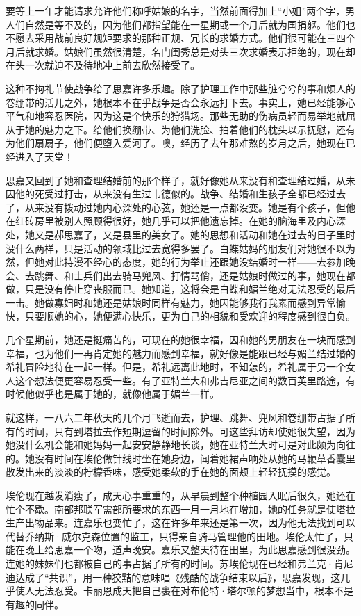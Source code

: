 \par 要等上一年才能请求允许他们称呼姑娘的名字，当然前面得加上“小姐”两个字，男人们自然是等不及的，因为他们都指望能在一星期或一个月后就为国捐躯。他们也不愿去采用战前良好规矩要求的那种正规、冗长的求婚方式。他们很可能在三四个月后就求婚。姑娘们虽然很清楚，名门闺秀总是对头三次求婚表示拒绝的，现在却在头一次就迫不及待地冲上前去欣然接受了。
\par 这种不拘礼节使战争给了思嘉许多乐趣。除了护理工作中那些脏兮兮的事和烦人的卷绷带的活儿之外，她根本不在乎战争是否会永远打下去。事实上，她已经能够心平气和地容忍医院，因为这是个快乐的狩猎场。那些无助的伤病员轻而易举地就屈从于她的魅力之下。给他们换绷带、为他们洗脸、拍着他们的枕头以示抚慰，还有为他们扇扇子，他们便堕入爱河了。噢，经历了去年那难熬的岁月之后，她现在已经进入了天堂！
\par 思嘉又回到了她和查理结婚前的那个样子，就好像她从来没有和查理结过婚，从未因他的死受过打击，从来没有生过韦德似的。战争、结婚和生孩子全都已经过去了，从来没有拨动过她内心深处的心弦，她还是一点都没变。她是有个孩子，但他在红砖房里被别人照顾得很好，她几乎可以把他遗忘掉。在她的脑海里及内心深处，她又是郝思嘉了，又是县里的美女了。她的思想和活动和她在过去的日子里时没什么两样，只是活动的领域比过去宽得多罢了。白蝶姑妈的朋友们对她很不以为然，但她对此持漫不经心的态度，她的行为举止还跟她没结婚时一样——去参加晚会、去跳舞、和士兵们出去骑马兜风、打情骂俏，还是姑娘时做过的事，她现在都做，只是没有停止穿丧服而已。她知道，这将会是白蝶和媚兰绝对无法忍受的最后一击。她做寡妇时和她还是姑娘时同样有魅力，她因能够我行我素而感到异常愉快，只要顺她的心，她便满心快乐，更为自己的相貌和受欢迎的程度感到很自负。
\par 几个星期前，她还是挺痛苦的，可现在的她很幸福，因和她的男朋友在一块而感到幸福，也为他们一再肯定她的魅力而感到幸福，就好像是能跟已经与媚兰结过婚的希礼冒险地待在一起一样。但是，希礼远离此地时，不知怎的，希礼属于另一个女人这个想法便更容易忍受一些。有了亚特兰大和弗吉尼亚之间的数百英里路途，有时候他似乎也是属于她的，就像他属于媚兰一样。
\par 就这样，一八六二年秋天的几个月飞逝而去，护理、跳舞、兜风和卷绷带占据了所有的时间，只有到塔拉去作短期逗留的时间除外。可这些拜访却使她很失望，因为她没什么机会能和她妈妈一起安安静静地长谈，她在亚特兰大时可是对此颇为向往的。她没有时间在埃伦做针线时坐在她身边，闻着她裙声响处从她的马鞭草香囊里散发出来的淡淡的柠檬香味，感受她柔软的手在她的面颊上轻轻抚摸的感觉。
\par 埃伦现在越发消瘦了，成天心事重重的，从早晨到整个种植园入眠后很久，她还在忙个不歇。南部邦联军需部所要求的东西一月一月地在增加，她的任务就是使塔拉生产出物品来。连嘉乐也变忙了，这在许多年来还是第一次，因为他无法找到可以代替乔纳斯·威尔克森位置的监工，只得亲自骑马管理他的田地。埃伦太忙了，只能在晚上给思嘉一个吻，道声晚安。嘉乐又整天待在田里，为此思嘉感到很没劲。连她的妹妹们也都被自己的事占据了所有的时间。苏埃伦现在已经和弗兰克·肯尼迪达成了“共识”，用一种狡黠的意味唱《残酷的战争结束以后》，思嘉发现，这几乎使人无法忍受。卡丽恩成天把自己裹在对布伦特·塔尔顿的梦想当中，根本不是有趣的同伴。
